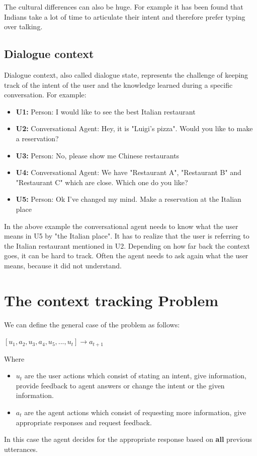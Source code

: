 \documentclass[conference]{IEEEtran}
\begin{document}
The cultural differences can also be huge. For example it has been found that Indians take a lot of time to articulate their intent and therefore prefer typing over talking\cite{chopra2017my}.


\subsection{Dialogue context}
Dialogue context, also called dialogue state, represents the challenge of keeping track of the intent of the user and the knowledge learned during a specific conversation. For example: 

\begin{itemize}
\item[]{\textbf{U1:} Person: I would like to see the best Italian restaurant}
\item[]{\textbf{U2:} Conversational Agent:  Hey, it is "Luigi's pizza". Would you like to make a reservation?}
\item[]{\textbf{U3:} Person: No, please show me Chinese restaurants}
\item[]{\textbf{U4:} Conversational Agent: We have "Restaurant A", "Restaurant B" and "Restaurant C" which are close. Which one do you like?}
\item[]{\textbf{U5:} Person: Ok I've changed my mind. Make a reservation at the Italian place}
\end{itemize}
In the above example the conversational agent needs to know what the user means in U5 by "the Italian place". It has to realize that the user is referring to the Italian restaurant mentioned in U2. 
Depending on how far back the context goes, it can be hard to track. Often the agent needs to ask again what the user means, because it did not understand.

\section{The context tracking Problem}
We can define the general case of the problem as follows:

$[u_{1},a_{2},u_{3},a_{4},u_{5},...,u_{t}] \rightarrow a_{t+1} $

Where
\begin{itemize}
\item{ $u_{t}$ are the user actions which consist of stating an intent, give information, provide feedback to agent answers or change the intent or the given information.}
\item{$a_{t}$ are the agent actions which consist of requesting more information, give appropriate responses and request feedback.}
\end{itemize}
In this case the agent decides for the appropriate response based on \textbf{all} previous utterances.
\end{document}
